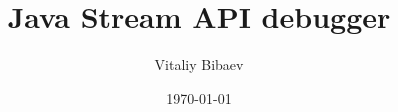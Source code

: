\documentclass{beamer}
\title[Stream Debugger]{Java Stream API debugger} %
\author{Vitaliy Bibaev} %
\institute[SpbAU] %
{
Saint-Petersburg Academic University \\ %
\medskip
\textit{vitaliy.bibaev@gmail.com} %
}
\date{\today} %
\begin{document}
\begin{frame}
\titlepage %
\end{frame}



\end{document}
